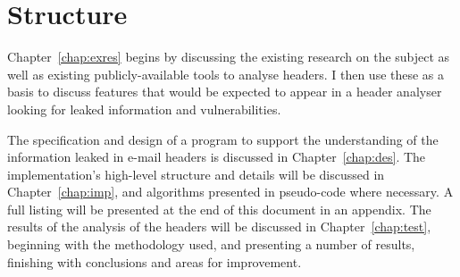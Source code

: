 \documentclass[a4paper,DIV=12,BCOR=7mm,abstract=yes,twoside,11pt]{scrreprt}
\begin{document}
\section{Structure}

Chapter~\ref{chap:exres} begins by discussing the existing research on
the subject as well as existing publicly-available tools to analyse
headers.  I then use these as a basis to discuss features that would be
expected to appear in a header analyser looking for leaked information
and vulnerabilities.

The specification and design of a program to support the understanding of the
information leaked in e-mail headers is discussed in Chapter~\ref{chap:des}.
The implementation's high-level structure and details will be discussed in
Chapter~\ref{chap:imp}, and algorithms presented in pseudo-code where
necessary.  A full listing will be presented at the end of this document in
an appendix. The results of the analysis of the headers will be discussed in
Chapter~\ref{chap:test}, beginning with the methodology used, and presenting
a number of results, finishing with conclusions and areas for improvement.
\end{document}
